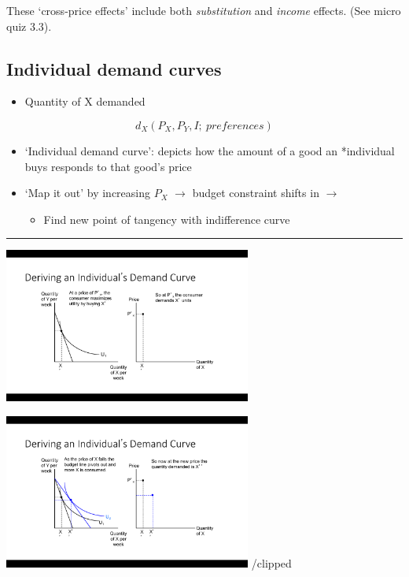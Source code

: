 \documentclass[]{article}
\providecommand{\tightlist}{%
  \setlength{\itemsep}{0pt}\setlength{\parskip}{0pt}}
\begin{document}
\bigskip

These `cross-price effects' include both \emph{substitution} and \emph{income} effects. (See micro quiz 3.3).

\hypertarget{individual-demand-curves}{%
\subsection{Individual demand curves}\label{individual-demand-curves}}

\begin{itemize}
\tightlist
\item
  Quantity of X demanded
\end{itemize}

\bigskip

\[d_X(P_X,P_Y,I; \: preferences)\]

\bigskip

\begin{itemize}
\tightlist
\item
  `Individual demand curve': depicts how the amount of a good an *individual buys responds to that good's price
\item
  `Map it out' by increasing \(P_X\) \(\rightarrow\) budget constraint shifts in \(\rightarrow\)

  \begin{itemize}
  \tightlist
  \item
    Find new point of tangency with indifference curve
  \end{itemize}
\end{itemize}

\begin{center}\rule{0.5\linewidth}{\linethickness}\end{center}

\includegraphics[height=2in]{picsfigs/dmd1.png}

\includegraphics[height=2in]{picsfigs/dmd2.png}
/clipped
\end{document}
